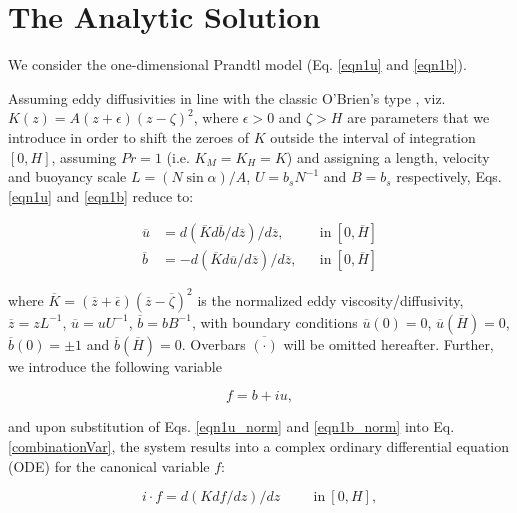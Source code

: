 \section{The Analytic Solution}
%
We consider the one-dimensional Prandtl model (Eq. \ref{eqn1u} and \ref{eqn1b}). 

Assuming eddy diffusivities in line with the classic O'Brien's type \citep{O'Brien1970}, viz. $K(z) = A (z + \epsilon)(z-\zeta)^2$, where $\epsilon>0$ and $\zeta>H$ are parameters that we introduce in order to shift the zeroes of $K$ outside the interval of integration $[0,H]$, assuming $Pr=1$ (i.e. $K_M=K_H=K$) and assigning a length, velocity and buoyancy scale $L= (N \sin{\alpha})/ A$, $U=b_s N^{-1}$ and $B=b_s$ respectively, Eqs. \ref{eqn1u} and \ref{eqn1b} reduce to:
%
\begin{linenomath*}
\begin{subequations}
\label{ode}
\begin{align}
	\overline{u} & = d( \overline{K} d\overline{b}/d\overline{z} )/d\overline{z}, && \mathrm{in}  \ [0,\overline{H}]
	\label{eqn1u_norm} \\
	\overline{b} & = -d( \overline{K} d\overline{u}/d\overline{z} )/d\overline{z}, &&\mathrm{in}  \ [0,\overline{H}]
	\label{eqn1b_norm}
\end{align}
\end{subequations}
\end{linenomath*}
%
where $\overline{K} = (\overline{z} + \overline{\epsilon})(\overline{z}-\overline{\zeta})^2$ is the normalized eddy viscosity/diffusivity, $\overline{z}=zL^{-1}$, $\overline{u} = uU^{-1}$, $\overline{b}=b B^{-1}$, with boundary conditions $\overline{u}(0)=0$, $\overline{u}(\overline{H}) = 0$, $\overline{b}(0)=\pm 1$ and $\overline{b}(\overline{H}) = 0$.
Overbars $\overline{(\cdot)}$ will be omitted hereafter.
%
Further, we introduce the following variable
%
\begin{linenomath*}
\begin{equation}
   f= b + i u,
   \label{combinationVar}
\end{equation}
\end{linenomath*}
%
and upon substitution of Eqs. \ref{eqn1u_norm} and \ref{eqn1b_norm} into Eq. \ref{combinationVar}, the system results into a complex ordinary differential equation (ODE) for the canonical variable $f$:
%
\begin{linenomath*}
\label{ode_norm}
\begin{equation}
	i \cdot f =  d(  K df/dz )/dz \hspace{1cm} \mathrm{in}  \ [0,H],
	\label{ode}
\end{equation}
\end{linenomath*}
